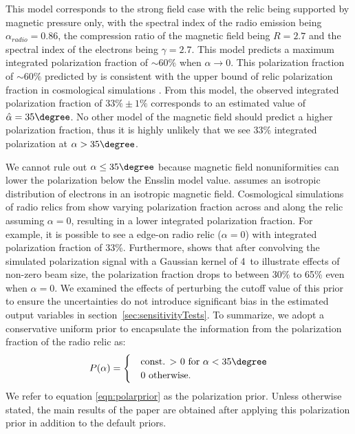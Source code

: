This model corresponds to the strong field case with the relic being supported by
magnetic pressure only, with the spectral index of the radio
emission being $\alpha_{radio} = 0.86$, the compression ratio of the
magnetic field being
$R=2.7$ and the spectral index of the electrons being $\gamma = 2.7$. 
This model predicts a maximum integrated polarization fraction of
$\sim60\%$ when $\alpha \rightarrow 0$. 
This  polarization fraction of $\sim60\%$ predicted by \citep{E98} is
consistent with the upper bound of relic polarization fraction in cosmological
simulations \citep{S13}. From this model, the
observed integrated polarization fraction of $33\%\pm1\%$ corresponds to an estimated value
of $\hat{\alpha}  = 35\degree$. 
No other model of the magnetic field should predict 
a higher polarization fraction, thus it is highly unlikely that we see 33\%
integrated polarization at $\alpha > 35\degree$.  
\par

We cannot rule out $\alpha \leq 35\degree$ because magnetic field
nonuniformities can lower the polarization below the Ensslin model value.
\cite{E98} assumes an isotropic distribution of electrons in an isotropic magnetic field. Cosmological
simulations of radio relics from \cite{S13} show varying polarization
fraction across and along the relic assuming $\alpha = 0$, resulting in a
lower integrated polarization fraction. For example, it is possible to see 
a edge-on radio relic ($\alpha = 0$) with integrated polarization fraction of 33\%. 
Furthermore, \cite{S13} shows that after convolving the
simulated polarization signal with a Gaussian kernel of 4\arcmin~to
illustrate effects of non-zero beam size, the polarization fraction drops
to between 30\% to 65\% even when $\alpha = 0$. We examined the effects of perturbing
the cutoff value of this prior to ensure the uncertainties do not
introduce significant bias in the estimated output variables in
section~\ref{sec:sensitivityTests}.
To summarize, we adopt a conservative uniform prior to encapsulate the
information from the polarization fraction of the radio relic as:
\begin{equation}
P(\alpha) = 
	\begin{cases}
	& \text{const. $>$ 0 for  }\alpha < 35 \degree \\ 
	& 0 \text{ otherwise}\label{eqn:polarprior}.
	\end{cases}
\end{equation}
We refer to equation \ref{eqn:polarprior} as the polarization prior. Unless
otherwise stated, the main results of the paper are obtained after applying
this polarization prior in addition to the default priors.

